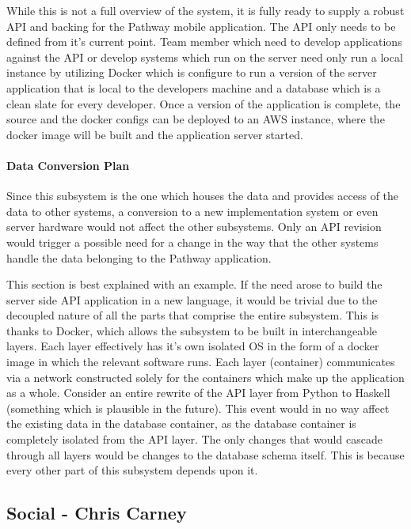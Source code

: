 ﻿\documentclass{article}
\begin{document}
While this is not a full overview of the system, it is fully ready to supply a robust
API and backing for the Pathway mobile application. The API only needs to be defined
from it's current point. Team member which need to develop applications against the API
or develop systems which run on the server need only run a local instance by utilizing
Docker which is configure to run a version of the server application that is local to the
developers machine and a database which is a clean slate for every developer. Once
a version of the application is complete, the source and the docker configs can be deployed
to an AWS instance, where the docker image will be built and the application server started.

\paragraph{Data Conversion Plan}
Since this subsystem is the one which houses the data and provides access of the data to other systems,
a conversion to a new implementation system or even server hardware would not affect the other subsystems.
Only an API revision would trigger a possible need for a change in the way that the other systems handle the
data belonging to the Pathway application.

This section is best explained with an example. If the need arose to build the server side
API application in a new language, it would be trivial due to the decoupled nature of all the
parts that comprise the entire subsystem. This is thanks to Docker, which allows the subsystem
to be built in interchangeable layers. Each layer effectively has it's own isolated OS in the form of
a docker image in which the relevant software runs. Each layer (container) communicates via a
network constructed solely for the containers which make up the application as a whole. Consider
an entire rewrite of the API layer from Python to Haskell (something which is plausible in the future).
This event would in no way affect the existing data in the database container, as the database container
is completely isolated from the API layer. The only changes that would cascade through all layers would
be changes to the database schema itself. This is because every other part of this subsystem depends upon it.



\subsection{Social - Chris Carney}
\end{document}
